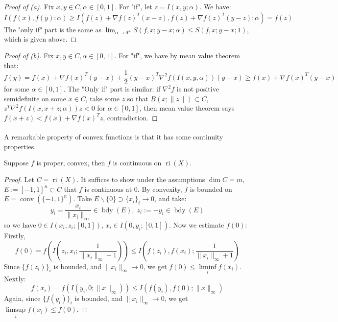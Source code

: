 \begin{proof}[Proof of (a)]
	Fix $x,y\in C,\alpha \in [0, 1]$. For "if", let $z=I(x,y; \alpha )$. We have:
	\[
		I(f(x),f(y);\alpha )  \geq I(f(z)+\nabla f(z)^T(x-z),f(z)+\nabla f(z)^T(y-z);\alpha ) = f(z)
	\]
	The "only if" part is the same as $\lim_{\alpha \to0^+}S(f,x; y-x; \alpha )\leq S(f,x; y-x; 1)$, which is given above.
\end{proof}
\begin{proof}[Proof of (b)]
	Fix $x,y\in C,\alpha \in [0, 1]$. For "if", we have by mean value theorem that:
	\[
		f(y)=f(x)+\nabla f(x)^T(y-x)+\frac{1}{2}(y-x)^T\nabla^2f(I(x,y,\alpha ))(y-x)\geq f(x)+\nabla f(x)^T(y-x)
	\]
	for some $\alpha \in[0,1]$. The "Only if" part is similar: if $\nabla^2 f$ is not positive semidefinite on some $x\in C$, take some $z$ so that $B(x;\|z\|)\subset C$, $z^T\nabla^2f(I(x, x+z;\alpha))z<0$ for $\alpha\in[0,1]$, then mean value theorem says $f(x+z)<f(x)+\nabla f(x)^Tz$, contradiction.
\end{proof}

\paragraph{}A remarkable property of convex functions is that it has some continuity properties.

\begin{prop}
	\label{prop:022-continuity}
	Suppose $f$ is proper, convex, then $f$ is continuous on $\operatorname{ri}(X)$.
\end{prop}

\begin{proof}
	Let $C=\operatorname{ri}(X)$. It suffices to show under the assumptions $\dim C=m$, $E:=[-1,1]^n\subset C$ that $f$ is continuous at $0$. By convexity, $f$ is bounded on $E=\operatorname{conv}(\{-1,1\}^n)$. Take $E\smallsetminus\{0\}\supset \{x_i\}_i\to 0$, and take:
	\[
		y_i=\frac{x_i}{\|x_i\|_\infty}\in \operatorname{bdy}(E),\;
		z_i:=-y_i\in \operatorname{bdy}(E)
	\]
	so we have $0\in I(x_i,z_i;[0,1])$, $x_i\in I(0,y_i;[0,1])$. Now we estimate $f(0)$: Firstly,
	\[
		f(0)=f\left(I\left(z_i,x_i;\frac{1}{\|x_i\|_\infty+1}\right)\right)\leq I\left(f(z_i),f(x_i);\frac{1}{\|x_i\|_\infty+1}\right)
	\]
	Since $\{f(z_i)\}_i$ is bounded, and $\|x_i\|_\infty\to0$, we get $f(0)\leq \underset{i}{\operatorname{liminf}}f(x_i)$. Nextly:
	\[
		f(x_i)=f(I(y_i, 0;\|x\|_\infty))\leq I(f(y_i),f(0);\|x\|_\infty)
	\]
	Again, since $\{f(y_i)\}_i$ is bounded, and $\|x_i\|_\infty\to0$, we get $\underset{i}{\operatorname{limsup}}f(x_i)\leq f(0)$.
\end{proof}

